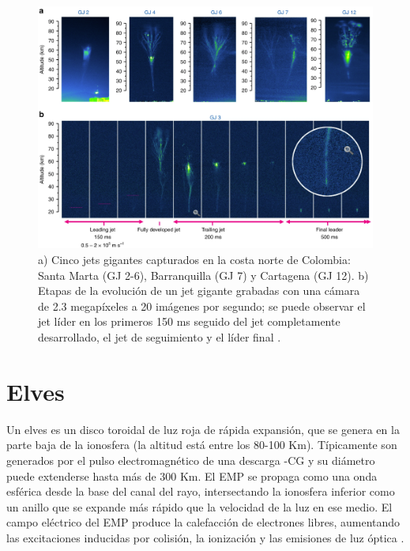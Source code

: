 \documentclass[12pt,oneside,openany,letter]{book}
\begin{document}
\begin{figure}
    \centering
    \includegraphics[scale=0.45]{figures/gigantic_jets_colombia.png}
    \caption[Jets gigantes capturados en la costa norte de Colombia]{a) Cinco jets gigantes capturados en la costa norte de Colombia: Santa Marta (GJ 2-6), Barranquilla (GJ 7) y Cartagena (GJ 12). b) Etapas de la evolución de un jet gigante grabadas con una cámara de 2.3 megapíxeles a 20 imágenes por segundo; se puede observar el jet líder en los primeros 150 ms seguido del jet completamente desarrollado, el jet de seguimiento y el líder final \cite{VanEtal2019}.}
    \label{fig:gigantic_jets_colombia}
\end{figure}

\section{Elves}
Un elves es un disco toroidal de luz roja de rápida expansión, que se genera en la parte baja de la ionosfera (la altitud está entre los 80-100 Km). Típicamente son generados por el pulso electromagnético de una descarga -CG y su diámetro puede extenderse hasta más de 300 Km. El EMP se propaga como una onda esférica desde la base del canal del rayo, intersectando la ionosfera inferior como un anillo que se expande más rápido que la velocidad de la luz en ese medio. El campo eléctrico del EMP produce la calefacción de electrones libres, aumentando las excitaciones inducidas por colisión, la ionización y las emisiones de luz óptica \cite{FullekrugEtal2006}.
\end{document}
